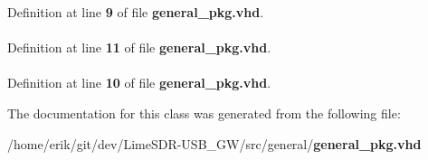 Definition at line {\bf 9} of file {\bf general\+\_\+pkg.\+vhd}.

\paragraph[{numeric\+\_\+std}]{\hspace{0.3cm}{\ttfamily [Package]}}\label{classgeneral__pkg_a2edc34402b573437d5f25fa90ba4013e}


Definition at line {\bf 11} of file {\bf general\+\_\+pkg.\+vhd}.

\paragraph[{std\+\_\+logic\+\_\+1164}]{\hspace{0.3cm}{\ttfamily [Package]}}\label{classgeneral__pkg_acd03516902501cd1c7296a98e22c6fcb}


Definition at line {\bf 10} of file {\bf general\+\_\+pkg.\+vhd}.



The documentation for this class was generated from the following file\+:\begin{DoxyCompactItemize}
\item 
/home/erik/git/dev/\+Lime\+S\+D\+R-\/\+U\+S\+B\+\_\+\+G\+W/src/general/{\bf general\+\_\+pkg.\+vhd}\end{DoxyCompactItemize}

